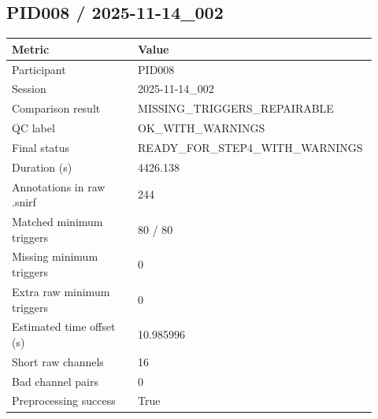 \subsection*{PID008 / 2025-11-14\_002}
\begin{tabular}{p{0.34\linewidth}p{0.58\linewidth}}
\toprule
Metric & Value\\
\midrule
Participant & PID008\\
Session & 2025-11-14\_002\\
Comparison result & MISSING\_TRIGGERS\_REPAIRABLE\\
QC label & OK\_WITH\_WARNINGS\\
Final status & READY\_FOR\_STEP4\_WITH\_WARNINGS\\
Duration (s) & 4426.138\\
Annotations in raw .snirf & 244\\
Matched minimum triggers & 80 / 80\\
Missing minimum triggers & 0\\
Extra raw minimum triggers & 0\\
Estimated time offset (s) & 10.985996\\
Short raw channels & 16\\
Bad channel pairs & 0\\
Preprocessing success & True\\
\bottomrule
\end{tabular}
